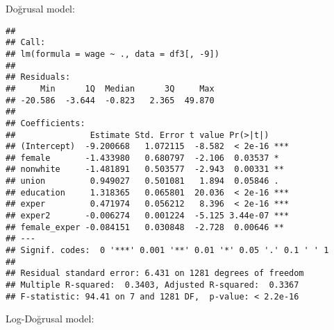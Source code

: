 \documentclass[
]{book}
\newenvironment{Shaded}{\begin{snugshade}}{\end{snugshade}}
\newcommand{\CommentTok}[1]{\textcolor[rgb]{0.56,0.35,0.01}{\textit{#1}}}
\newcommand{\DataTypeTok}[1]{\textcolor[rgb]{0.13,0.29,0.53}{#1}}
\newcommand{\DecValTok}[1]{\textcolor[rgb]{0.00,0.00,0.81}{#1}}
\newcommand{\KeywordTok}[1]{\textcolor[rgb]{0.13,0.29,0.53}{\textbf{#1}}}
\newcommand{\NormalTok}[1]{#1}
\newcommand{\OperatorTok}[1]{\textcolor[rgb]{0.81,0.36,0.00}{\textbf{#1}}}
\newcommand{\StringTok}[1]{\textcolor[rgb]{0.31,0.60,0.02}{#1}}
\begin{document}
\begin{Shaded}
\end{Shaded}

Doğrusal model:

\begin{Shaded}
\end{Shaded}

\begin{verbatim}
## 
## Call:
## lm(formula = wage ~ ., data = df3[, -9])
## 
## Residuals:
##     Min      1Q  Median      3Q     Max 
## -20.586  -3.644  -0.823   2.365  49.870 
## 
## Coefficients:
##               Estimate Std. Error t value Pr(>|t|)    
## (Intercept)  -9.200668   1.072115  -8.582  < 2e-16 ***
## female       -1.433980   0.680797  -2.106  0.03537 *  
## nonwhite     -1.481891   0.503577  -2.943  0.00331 ** 
## union         0.949027   0.501081   1.894  0.05846 .  
## education     1.318365   0.065801  20.036  < 2e-16 ***
## exper         0.471974   0.056212   8.396  < 2e-16 ***
## exper2       -0.006274   0.001224  -5.125 3.44e-07 ***
## female_exper -0.084151   0.030848  -2.728  0.00646 ** 
## ---
## Signif. codes:  0 '***' 0.001 '**' 0.01 '*' 0.05 '.' 0.1 ' ' 1
## 
## Residual standard error: 6.431 on 1281 degrees of freedom
## Multiple R-squared:  0.3403, Adjusted R-squared:  0.3367 
## F-statistic: 94.41 on 7 and 1281 DF,  p-value: < 2.2e-16
\end{verbatim}

Log-Doğrusal model:
\end{document}
